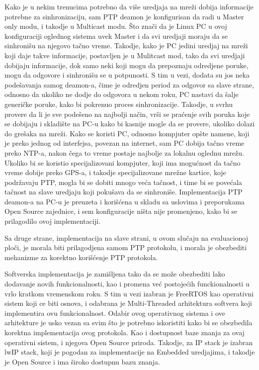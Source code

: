 \documentclass[a4paper,12pt, master]{etf}
\begin{document}
	Kako je u nekim trenucima potrebno da vi\v{s}e uredjaja na mre\v{z}i dobija 
	informacije potrebne za sinhronizaciju, sam PTP deamon je konfigurisan da 
	radi u Master only modu, i takodje u Multicast modu. \v{S}to zna\v{c}i da 
	je Linux PC u ovoj konfiguraciji oglednog sistema uvek Master i da svi 
	uredjaji moraju da se sinhroni\v{s}u na njegovo ta\v{c}no vreme. Takodje, 
	kako je PC jedini uredjaj na mre\v{z}i koji daje takve informacije, 
	postavljen je u Mulitcast mod, tako da svi uredjaji dobijaju informacije, 
	dok samo neki koji mogu da prepoznaju odredjene poruke, mogu da odgovore i 
	sinhroni\v{s}u se u potpunosti. S tim u vezi, dodata su jos neka 
	pode\v{s}avanja samog deamon-a, \v{c}ime je odredjen period za odgovor sa 
	slave strane, odnosno da ukoliko ne dodje do odgovora u nekom roku, PC 
	nastavi da \v{s}alje generi\v{c}ke poruke, kako bi pokrenuo proces 
	sinhronizacije. Takodje, u svrhu provere da li je sve pode\v{s}eno na 
	najbolji na\v{c}in, vr\v{s}i se pra\'{c}enje svih poruka koje se dobijaju i 
	skladi\v{s}te na PC-u kako bi kasnije mogle da se provere, ukoliko dolazi 
	do gre\v{s}aka na mre\v{z}i. Kako se koristi PC, odnosno kompjuter 
	op\v{s}te namene, koji je preko jednog od interfejsa, povezan na internet, 
	sam PC dobija ta\v{c}no vreme preko NTP-a, nakon \v{c}ega to vreme postaje 
	najbolje za lokalnu oglednu mre\v{z}u. Ukoliko bi se koristio 
	specijalizovani kompjuter, koji ima mogu\'{c}nost da ta\v{c}no vreme dobije 
	preko GPS-a, i takodje specijalizovane mre\v{z}ne kartice, koje 
	podr\v{z}avaju PTP, mogla bi se dobiti mnogo ve\'{c}a ta\v{c}nost, i time 
	bi se pove\'{c}ala ta\v{c}nost na slave uredjaju koji poku\v{s}ava da se 
	sinhroni\v{s}e. Implementacija PTP deamon-a na PC-u je preuzeta i 
	kori\v{s}\'{c}ena u skladu sa uslovima i preporukama Open Source zajednice, 
	i sem konfiguracije ni\v{s}ta nije promenjeno, kako bi se prilagodilo ovoj 
	implementaciji.

    Sa druge strane, implementacija na slave strani, u ovom slu\v{c}aju na
	evaluacionoj plo\v{c}i, je morala biti prilagodjena samom PTP protokolu, i 
	morala je obezbediti mehanizme za korektno kori\v{s}\'{c}enje PTP protokola.

	Softverska implementacija je zami\v{s}ljena tako da se mo\v{z}e obezbediti 
	lako dodavanje novih funkcionalnosti, kao i promena ve\'{c} postoje\'{c}ih 
	funckionalnosti u vrlo kratkom vremenskom roku. S tim u vezi izabran je 
	FreeRTOS kao operativni sistem koji ce biti osnova, i odabrana je 
	Multi-Threaded arhitektura softvera koji implementira ovu funkcionalnost. 
	Odabir ovog operativnog sistema i ove arhitekture je usko vezan sa svim 
	\v{s}to je potrebno iskoristiti kako bi se obezbedila korektna 
	implementacija ovog protokola. Kao i dostupnost baze znanja za ovaj 
	operativni sistem, i njegova Open Source priroda. Takodje, za IP stack je 
	izabran lwIP stack, koji je pogodan za implementacije na Embedded 
	uredjajima, i takodje je Open Source i ima \v{s}iroko dostupnu bazu znanja.
\end{document}
